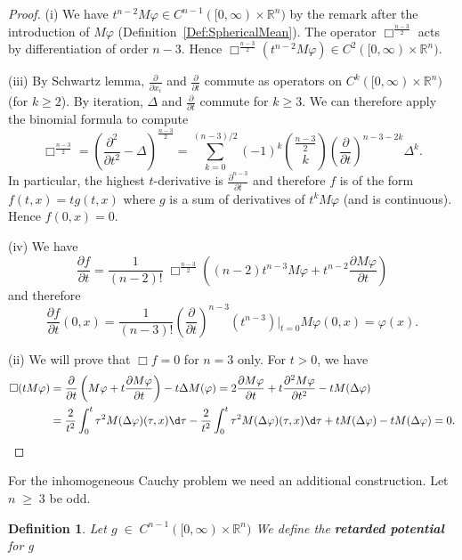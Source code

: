 \documentclass[12pt, oneside, a4paper]{article}
\theoremstyle{dfn}
\newtheorem{dfn}[thm]{Definition}
\def\Rbb{\ensuremath{\mathbb{R}}}
\begin{document}
\begin{proof}
(i) We have $t^{n-2} M\varphi \in C^{n-1}([0,\infty)\times \Rbb^n)$ by the remark after the introduction of $M\varphi$ (Definition~\ref{Def:SphericalMean}). The operator $\Box^{\frac{n-3}{2}}$ acts by differentiation of order $n - 3$. Hence $\Box^{\frac{n-3}{2}} (t^{n-2} M\varphi) \in C^{2}([0,\infty)\times \Rbb^n)$.

(iii) By Schwartz lemma, $\frac{\partial}{\partial x_i}$ and $\frac{\partial}{\partial t}$ commute as operators on $C^k([0,\infty)\times \Rbb^n)$ (for $k \geqslant 2$). By iteration, $\Delta$ and $\frac{\partial}{\partial t}$ commute for $k \geqslant 3$. We can therefore apply the binomial formula to compute
\[
\Box^{\frac{n-3}{2}}
= \left( \frac{\partial^2}{\partial t^2} - \Delta \right)^{\frac{n-3}{2}}
= \sum_{k=0}^{(n-3)/2} (-1)^k \binom{\frac{n-3}{2}}{k} \left( \frac{\partial}{\partial t} \right)^{n - 3 - 2k} \Delta^k.
\]
In particular, the highest $t$-derivative is $\frac{\partial^{n-3}}{\partial t}$ and therefore $f$ is of the form
$
f(t,x) = t g(t,x)
$
where $g$ is a sum of derivatives of $t^k M\varphi$ (and is continuous). Hence $f(0,x) = 0$.

(iv) We have
\[
\frac{\partial f}{\partial t}
= \frac{1}{(n-2)!} \; \Box^{\frac{n-3}{2}}
\left( (n-2) t^{n-3} M\varphi + t^{n-2} \frac{\partial M\varphi}{\partial t} \right)
\]
and therefore
\[
\frac{\partial f}{\partial t}(0,x)
= \frac{1}{(n-3)!} \left( \frac{\partial}{\partial t} \right)^{n-3} (t^{n-3})|_{t=0} M\varphi(0,x) = \varphi(x).
\]

(ii) We will prove that $\Box f = 0$ for $n = 3$ only. For $t > 0$, we have
\begin{align*}
	\Box(tM\varphi)
	&= \frac{\partial}{\partial t} \left( M\varphi + t \frac{\partial M\varphi}{\partial t} \right) - t \Delta M(\varphi)
	= 2 \frac{\partial M \varphi}{\partial t} + t \frac{\partial^2 M \varphi}{\partial t^2} - t M(\Delta \varphi) \\
	&= \frac{2}{t^2} \int^t_0 \tau^2 M(\Delta\varphi) (\tau,x) \d\tau
		- \frac{2}{t^2} \int^t_0 \tau^2 M(\Delta\varphi) (\tau,x) \d\tau
		+ t M(\Delta \varphi) - t M(\Delta \varphi) = 0.
\end{align*}
\end{proof}
For the inhomogeneous Cauchy problem we need an additional construction. Let $n\;\geq\;3$ be odd.
\begin{dfn}
Let $g\;\in\;C^{n-1}([0,\infty)\times \Rbb^n)$
We define the \textbf{retarded potential} for g 
\end{dfn}
 
\end{document}
